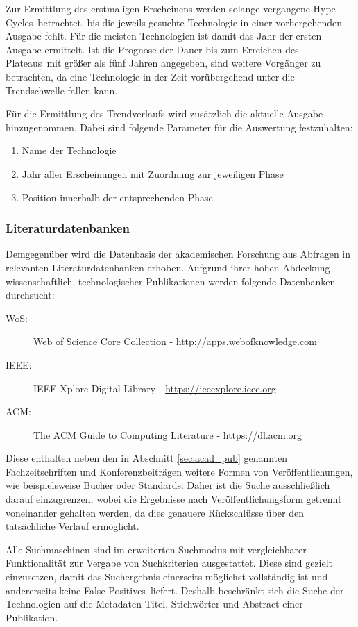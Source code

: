 Zur Ermittlung des erstmaligen Erscheinens werden solange vergangene \glqq Hype Cycles\grqq~betrachtet, bis die jeweils gesuchte Technologie in einer vorhergehenden Ausgabe fehlt. Für die meisten Technologien ist damit das Jahr der ersten Ausgabe ermittelt. Ist die Prognose der Dauer bis zum Erreichen des \glqq Plateaus\grqq~mit größer als fünf Jahren angegeben, sind weitere Vorgänger zu betrachten, da eine Technologie in der Zeit vorübergehend unter die Trendschwelle fallen kann.

Für die Ermittlung des Trendverlaufs wird zusätzlich die aktuelle Ausgabe hinzugenommen. Dabei sind folgende Parameter für die Auswertung festzuhalten:

\begin{enumerate}
	\item Name der Technologie
	\item Jahr aller Erscheinungen mit Zuordnung zur jeweiligen Phase
	\item Position innerhalb der entsprechenden Phase
\end{enumerate}

\subsubsection{Literaturdatenbanken}\label{sec:lit_data}
Demgegenüber wird die Datenbasis der akademischen Forschung aus Abfragen in relevanten Literaturdatenbanken erhoben. Aufgrund ihrer hohen Abdeckung wissenschaftlich, technologischer Publikationen werden folgende Datenbanken durchsucht:
\begin{description}
	\item [\acs{WoS}:] Web of Science Core Collection - \url{http://apps.webofknowledge.com}
	\item [\acs{IEEE}:] IEEE Xplore Digital Library - \url{https://ieeexplore.ieee.org}
	\item [\acs{ACM}:] The ACM Guide to Computing Literature - \url{https://dl.acm.org}
\end{description}

Diese enthalten neben den in Abschnitt \ref{sec:acad_pub} genannten Fachzeitschriften und Konferenzbeiträgen weitere Formen von Veröffentlichungen, wie beispielsweise Bücher oder Standards. Daher ist die Suche ausschließlich darauf einzugrenzen, wobei die Ergebnisse nach Veröffentlichungsform getrennt voneinander gehalten werden, da dies genauere Rückschlüsse über den tatsächliche Verlauf ermöglicht.

Alle Suchmaschinen sind im erweiterten Suchmodus mit vergleichbarer Funktionalität zur Vergabe von Suchkriterien ausgestattet. Diese sind gezielt einzusetzen, damit das Suchergebnis einerseits möglichst vollständig ist und andererseits keine \glqq False Positives\grqq~liefert. Deshalb beschränkt sich die Suche der Technologien auf die Metadaten Titel, Stichwörter und Abstract einer Publikation.

